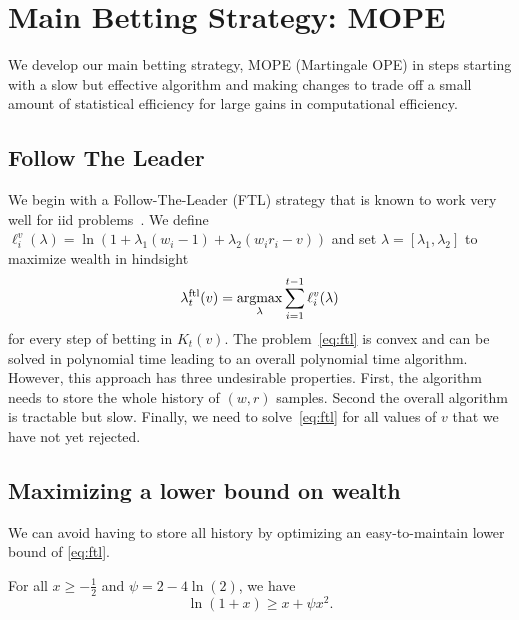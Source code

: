 \section{Main Betting Strategy: MOPE}
We develop our main betting strategy, MOPE (Martingale OPE) 
in steps starting with a slow but effective algorithm 
and making changes to trade off a small amount of statistical
efficiency for large gains in computational efficiency.

\subsection{Follow The Leader}
We begin with a Follow-The-Leader
(FTL) strategy that is known 
to work very well for iid problems~\cite{de2014follow}.
We define $\ell_i^v(\lambda)=\ln(1+\lambda_1 (w_i-1)+\lambda_2(w_i r_i -
v))$ and set $\lambda = [\lambda_1, \lambda_2]$ to maximize 
wealth in
hindsight 
\begin{equation}
\lambda_{t}^{\textrm{ftl}}(v) = \operatorname*{argmax}_{\lambda} \sum_{i=1}^{t-1}
\ell_{i}^{v}(\lambda)
\label{eq:ftl}
\end{equation}
for every step of betting in $K_t(v)$.  
The problem~\eqref{eq:ftl} is convex and can be solved in
polynomial time leading to an overall polynomial time algorithm. 
However, this approach has three undesirable properties. 
First, the algorithm needs to store
the whole history of $(w,r)$ samples. 
Second the overall algorithm is
tractable but slow.  
Finally, we need to solve~\eqref{eq:ftl} for all
values of $v$ that we have not yet rejected.


\subsection{Maximizing a lower bound on wealth}

We can avoid having to store all history by optimizing an easy-to-maintain
lower bound of \eqref{eq:ftl}.  
\begin{lemma} 
\label{lem:quadbound}
For all $x\geq -\frac{1}{2}$ and $\psi=2-4\ln(2)$, we have
\[
\ln(1+x)\geq x + \psi x^2.
\]
\end{lemma}

